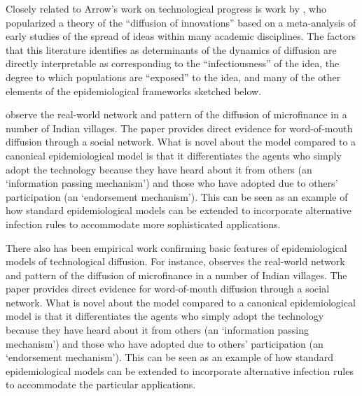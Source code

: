 Closely related to Arrow's work on technological progress is work by \href{https://en.wikipedia.org/wiki/Diffusion_of_innovations}{\cite{rogers1962diffusion}}, who popularized a theory of the ``diffusion of innovations'' based on a meta-analysis of early studies of the spread of ideas within many academic disciplines.  The factors that this literature identifies as determinants of the dynamics of diffusion are directly interpretable as corresponding to the ``infectiousness'' of the idea, the degree to which populations are ``exposed'' to the idea, and many of the other elements of the epidemiological frameworks sketched below.

\href{https://pubmed.ncbi.nlm.nih.gov/23888042/}{\cite{banerjee2013diffusion}} observe the real-world network and pattern of the diffusion of microfinance in a number of Indian villages. The paper provides direct evidence for word-of-mouth diffusion through a social network. What is novel about the model compared to a canonical epidemiological model is that it differentiates the agents who simply adopt the technology because they have heard about it from others (an `information passing mechanism') and those who have adopted due to others' participation (an `endorsement mechanism'). This can be seen as an example of how standard epidemiological models can be extended to incorporate alternative infection rules to accommodate more sophisticated applications.

There also has been empirical work confirming basic features of epidemiological models of technological diffusion. For instance,  \href{https://pubmed.ncbi.nlm.nih.gov/23888042/}{\cite{banerjee2013diffusion}} observes the real-world network and pattern of the diffusion of microfinance in a number of Indian villages. The paper provides direct evidence for word-of-mouth diffusion through a social network. What is novel about the model compared to a canonical epidemiological model is that it differentiates the agents who simply adopt the technology because they have heard about it from others (an `information passing mechanism') and those who have adopted due to others' participation (an `endorsement mechanism'). This can be seen as an example of how standard epidemiological models can be extended to incorporate alternative infection rules to accommodate the particular applications.%

